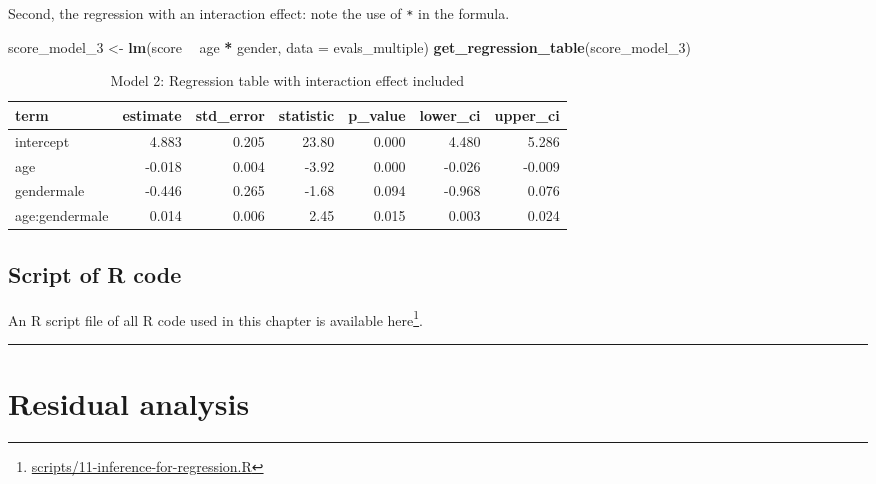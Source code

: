 \documentclass[12pt, krantz2,]{krantz}
\makeatletter
\newenvironment{Shaded}{\begin{snugshade}}{\end{snugshade}}
\newcommand{\DataTypeTok}[1]{\textcolor[rgb]{0.27,0.27,0.27}{#1}}
\newcommand{\DecValTok}[1]{\textcolor[rgb]{0.06,0.06,0.06}{#1}}
\newcommand{\KeywordTok}[1]{\textcolor[rgb]{0.27,0.27,0.27}{\textbf{#1}}}
\newcommand{\NormalTok}[1]{#1}
\newcommand{\OperatorTok}[1]{\textcolor[rgb]{0.43,0.43,0.43}{\textbf{#1}}}
\newcommand{\StringTok}[1]{\textcolor[rgb]{0.5,0.5,0.5}{#1}}
\renewcommand{\href}[2]{#2\footnote{\url{#1}}}
\newenvironment{kframe}{%
\medskip{}
\setlength{\fboxsep}{.8em}
 \def\at@end@of@kframe{}%
 \ifinner\ifhmode%
  \def\at@end@of@kframe{\end{minipage}}%
  \begin{minipage}{\columnwidth}%
 \fi\fi%
 \def\FrameCommand##1{\hskip\@totalleftmargin \hskip-\fboxsep
 \colorbox{shadecolor}{##1}\hskip-\fboxsep
     \hskip-\linewidth \hskip-\@totalleftmargin \hskip\columnwidth}%
 \MakeFramed {\advance\hsize-\width
   \@totalleftmargin\z@ \linewidth\hsize
   \@setminipage}}%
 {\par\unskip\endMakeFramed%
 \at@end@of@kframe}
\renewenvironment{Shaded}{\begin{kframe}}{\end{kframe}}
\makeatother
\begin{document}
Second, the regression with an interaction effect: note the use of \texttt{*} in the formula.

\begin{Shaded}
\begin{Highlighting}[]
\NormalTok{score_model_}\DecValTok{3}\NormalTok{ <-}\StringTok{ }\KeywordTok{lm}\NormalTok{(score }\OperatorTok{~}\StringTok{ }\NormalTok{age }\OperatorTok{*}\StringTok{ }\NormalTok{gender, }\DataTypeTok{data =}\NormalTok{ evals_multiple)}
\KeywordTok{get_regression_table}\NormalTok{(score_model_}\DecValTok{3}\NormalTok{)}
\end{Highlighting}
\end{Shaded}

\begin{table}[H]

\caption{\label{tab:unnamed-chunk-463}Model 2: Regression table with interaction effect included}
\centering
\fontsize{10}{12}\selectfont
\begin{tabular}{lrrrrrr}
\toprule
term & estimate & std\_error & statistic & p\_value & lower\_ci & upper\_ci\\
\midrule
intercept & 4.883 & 0.205 & 23.80 & 0.000 & 4.480 & 5.286\\
age & -0.018 & 0.004 & -3.92 & 0.000 & -0.026 & -0.009\\
gendermale & -0.446 & 0.265 & -1.68 & 0.094 & -0.968 & 0.076\\
age:gendermale & 0.014 & 0.006 & 2.45 & 0.015 & 0.003 & 0.024\\
\bottomrule
\end{tabular}
\end{table}

\hypertarget{script-of-r-code}{%
\subsection{Script of R code}\label{script-of-r-code}}

An R script file of all R code used in this chapter is available \href{scripts/11-inference-for-regression.R}{here}.

\begin{center}\rule{0.5\linewidth}{\linethickness}\end{center}

\hypertarget{residual-analysis}{%
\section{Residual analysis}\label{residual-analysis}}
\end{document}

